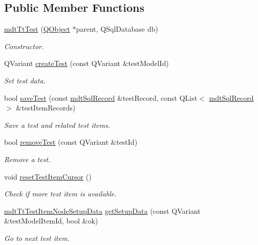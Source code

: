 \subsection*{Public Member Functions}
\begin{DoxyCompactItemize}
\item 
\hyperlink{classmdt_tt_test_a607eadd86d30aa34dbd9daaf4c03725c}{mdt\-Tt\-Test} (\hyperlink{class_q_object}{Q\-Object} $\ast$parent, Q\-Sql\-Database db)
\begin{DoxyCompactList}\small\item\em Constructor. \end{DoxyCompactList}\item 
Q\-Variant \hyperlink{classmdt_tt_test_a07249bc1f02d16974af0b171d7e391de}{create\-Test} (const Q\-Variant \&test\-Model\-Id)
\begin{DoxyCompactList}\small\item\em Set test data. \end{DoxyCompactList}\item 
bool \hyperlink{classmdt_tt_test_a816f7197031e96148996333b9c625702}{save\-Test} (const \hyperlink{classmdt_sql_record}{mdt\-Sql\-Record} \&test\-Record, const Q\-List$<$ \hyperlink{classmdt_sql_record}{mdt\-Sql\-Record} $>$ \&test\-Item\-Records)
\begin{DoxyCompactList}\small\item\em Save a test and related test items. \end{DoxyCompactList}\item 
bool \hyperlink{classmdt_tt_test_a8dc26af849b8e928385e5f25697ebb47}{remove\-Test} (const Q\-Variant \&test\-Id)
\begin{DoxyCompactList}\small\item\em Remove a test. \end{DoxyCompactList}\item 
void \hyperlink{classmdt_tt_test_ae8cafeb9cebf1c11ca136a94ba75020c}{reset\-Test\-Item\-Cursor} ()
\begin{DoxyCompactList}\small\item\em Check if more test item is available. \end{DoxyCompactList}\item 
\hyperlink{classmdt_tt_test_item_node_setup_data}{mdt\-Tt\-Test\-Item\-Node\-Setup\-Data} \hyperlink{classmdt_tt_test_a71e868fa2c182b33982276e52f9c4d23}{get\-Setup\-Data} (const Q\-Variant \&test\-Model\-Item\-Id, bool \&ok)
\begin{DoxyCompactList}\small\item\em Go to next test item. \end{DoxyCompactList}\item 

\end{DoxyCompactItemize}
